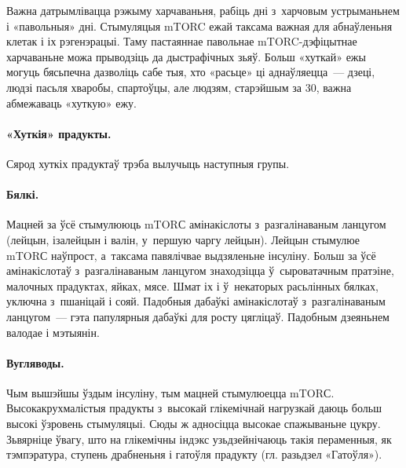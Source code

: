 
Важна датрымлівацца рэжыму харчаваньня, рабіць дні з~харчовым устрыманьнем і «павольныя» дні. Стымуляцыя mTORC ежай таксама важная для абнаўленьня клетак і іх рэгенэрацыі. Таму пастаяннае павольнае mTORC-дэфіцытнае харчаваньне можа прыводзіць да дыстрафічных зьяў. Больш «хуткай» ежы могуць бясьпечна дазволіць сабе тыя, хто «расьце» ці аднаўляецца~--- дзеці, людзі пасьля хваробы, спартоўцы, але людзям, старэйшым за 30, важна абмежаваць «хуткую» ежу.

\paragraph{«Хуткія» прадукты.}
Сярод хуткіх прадуктаў трэба вылучыць наступныя групы.

\paragraph{Бялкі.}
Мацней за ўсё стымулююць mTORС амінакіслоты з~разгалінаваным ланцугом (лейцын, ізалейцын і валін, у~першую чаргу лейцын). Лейцын стымулюе mTORС наўпрост, а~таксама павялічвае выдзяленьне інсуліну. Больш за ўсё амінакіслотаў з~разгалінаваным ланцугом знаходзіцца ў~сыроватачным пратэіне, малочных прадуктах, яйках, мясе. Шмат іх і ў~некаторых расьлінных бялках, уключна з~пшаніцай і сояй. Падобныя дабаўкі амінакіслотаў з~разгалінаваным ланцугом~--- гэта папулярныя дабаўкі для росту цягліцаў. Падобным дзеяньнем валодае і мэтыянін.

\paragraph{Вугляводы.}
Чым вышэйшы ўздым інсуліну, тым мацней стымулюецца mTORС. Высокакрухмалістыя прадукты з~высокай глікемічнай нагрузкай даюць больш высокі ўзровень стымуляцыі. Сюды ж адносіцца высокае спажываньне цукру. Зьвярніце ўвагу, што на глікемічны індэкс узьдзейнічаюць такія пераменныя, як тэмпэратура, ступень драбненьня і гатоўля прадукту (гл. разьдзел «Гатоўля»).


